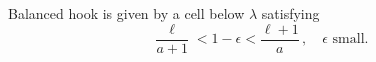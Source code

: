 \documentclass[dvipsnames,handout]{beamer}
\theoremstyle{definition}
\newcounter{c}
\begin{document}
\begin{frame}
\begin{center}
\begin{tikzpicture}[xscale = 0.4,yscale = 0.4]
\end{tikzpicture}
\end{center} \pause
Balanced hook is given by a cell below \(\lambda\) satisfying \[
  \frac{\ell}{a+1} < 1-\epsilon < \frac{\ell+1}{a}\,,\quad \epsilon
  \text{ small}.
\]
\end{frame}
\end{document}
